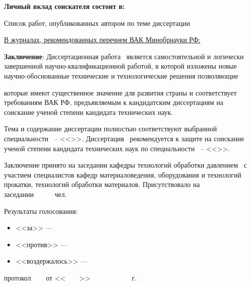 \textbf{Личный вклад соискателя состоит в:}




\nocite{hrisanovstu2017prodobgim}
\nocite{seregkin_stu2017sferaad1}
\nocite{melnikov_stu2016raznotolschinnost}
\nocite{stupnikov2020raznotolschinnost}
\nocite{stupnikov2020obratn_nabor}
\nocite{stupnikov2015obgim_evs}
\nocite{stupnikov2015obgim_evs_onl}
\nocite{stupnikov2015matmodelir_skladok}
\nocite{stupnikov_patent2017}


Список работ, опубликованных автором по теме диссертации

\underline{В журналах, рекомендованных перечнем ВАК Минобрнауки РФ:}


\textbf{Заключение}:
Диссертационная работа \thesisAuthorLastNameFromFull\ является самостоятельной и логически завершенной научно-квалификационной работой, в которой изложены новые научно-обоснованные технические и технологические решения позволяющие %


которые имеют существенное значение для развития страны и соответствует требованиям ВАК РФ, предъявляемым к кандидатским диссертациям на соискание ученой степени кандидата технических наук.

Тема и содержание диссертации полностью соответствуют выбранной специальности \thesisSpecialtyNumber\ -- <<\thesisSpecialtyTitle>>.
Диссертация {\thesisTitle} \thesisAuthorLastNameFromFull\ рекомендуется к защите на соискание ученой степени кандидата технических наук по специальности \thesisSpecialtyNumber\ -- <<\thesisSpecialtyTitle>>.

Заключение принято на заседании кафедры технологий обработки давлением \thesisOrganizationShort\ с участием специалистов кафедр материаловедения, оборудования и технологий прокатки, технологий обработки материалов. Присутствовало на заседании~~~~~~чел. 

Результаты голосования: 
\begin{itemize}
    \item <<за>> --- 
    \item <<против>> ---
    \item<<воздержалось>> ---
\end{itemize}
протокол \textnumero~~~ от <<~~~~>>~~~~~~~~~~~\thesisYear~г.


